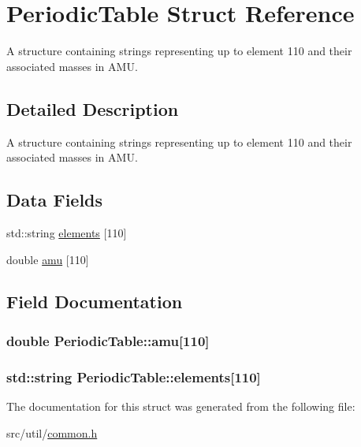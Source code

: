 \hypertarget{struct_periodic_table}{}\section{Periodic\+Table Struct Reference}
\label{struct_periodic_table}


A structure containing strings representing up to element 110 and their associated masses in A\+M\+U.  




\subsection{Detailed Description}
A structure containing strings representing up to element 110 and their associated masses in A\+M\+U. \subsection*{Data Fields}
\begin{DoxyCompactItemize}
\item 
std\+::string \hyperlink{struct_periodic_table_ab11add4b0907eeaabe309791f8c2a4a4}{elements} \mbox{[}110\mbox{]}
\item 
double \hyperlink{struct_periodic_table_a8932a977c48df97676a3e85830c9e855}{amu} \mbox{[}110\mbox{]}
\end{DoxyCompactItemize}


\subsection{Field Documentation}
\hypertarget{struct_periodic_table_a8932a977c48df97676a3e85830c9e855}{}
\subsubsection[{amu}]{\setlength{\rightskip}{0pt plus 5cm}double Periodic\+Table\+::amu\mbox{[}110\mbox{]}}\label{struct_periodic_table_a8932a977c48df97676a3e85830c9e855}
\hypertarget{struct_periodic_table_ab11add4b0907eeaabe309791f8c2a4a4}{}
\subsubsection[{elements}]{\setlength{\rightskip}{0pt plus 5cm}std\+::string Periodic\+Table\+::elements\mbox{[}110\mbox{]}}\label{struct_periodic_table_ab11add4b0907eeaabe309791f8c2a4a4}


The documentation for this struct was generated from the following file\+:\begin{DoxyCompactItemize}
\item 
src/util/\hyperlink{common_8h}{common.\+h}\end{DoxyCompactItemize}
